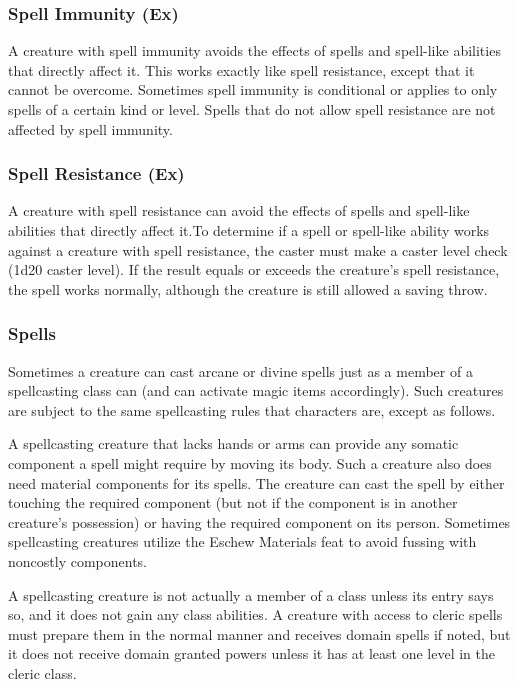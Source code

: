 {\subsubsection{Spell Immunity (Ex)} A creature with spell immunity avoids the effects of spells and spell-like abilities that directly affect it. This works exactly like spell resistance, except that it cannot be overcome. Sometimes spell immunity is conditional or applies to only spells of a certain kind or level. Spells that do not allow spell resistance are not affected by spell immunity.

\subsubsection{Spell Resistance (Ex)} A creature with spell resistance can avoid the effects of spells and spell-like abilities that directly affect it.To determine if a spell or spell-like ability works against a creature with spell resistance, the caster must make a caster level check (1d20 \add caster level). If the result equals or exceeds the creature's spell resistance, the spell works normally, although the creature is still allowed a saving throw.

\subsubsection{Spells} Sometimes a creature can cast arcane or divine spells just as a member of a spellcasting class can (and can activate magic items accordingly). Such creatures are subject to the same spellcasting rules that characters are, except as follows. 

A spellcasting creature that lacks hands or arms can provide any somatic component a spell might require by moving its body. Such a creature also does need material components for its spells. The creature can cast the spell by either touching the required component (but not if the component is in another creature's possession) or having the required component on its person. Sometimes spellcasting creatures utilize the Eschew Materials feat to avoid fussing with noncostly components.

A spellcasting creature is not actually a member of a class unless its entry says so, and it does not gain any class abilities. A creature with access to cleric spells must prepare them in the normal manner and receives domain spells if noted, but it does not receive domain granted powers unless it has at least one level in the cleric class.

}
